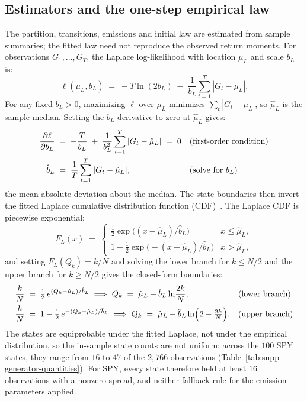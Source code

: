 \subsection{Estimators and the one-step empirical law}
\label{sec:supp-gen-estimators}

The partition, transitions, emissions and initial law are estimated from sample summaries; the fitted law need not reproduce the observed return moments. For observations $G_1, \dots, G_T$, the Laplace
log-likelihood with location $\mu_L$ and scale $b_L$ is:
\begin{equation}
  \ell(\mu_L, b_L) \;=\;
  -T \ln (2 b_L) \;-\; \frac{1}{b_L} \sum_{t=1}^{T} |G_t - \mu_L|.
  \label{eq:supp-laplace-ll}
\end{equation}
For any fixed $b_L > 0$, maximizing $\ell$ over $\mu_L$ minimizes
$\sum_t |G_t - \mu_L|$, so $\hat\mu_L$ is the sample median. Setting
the $b_L$ derivative to zero at $\hat\mu_L$ gives:
\begin{align}
  \frac{\partial \ell}{\partial b_L}
   &\;=\; -\frac{T}{b_L}
     \;+\; \frac{1}{b_L^2} \sum_{t=1}^{T} |G_t - \hat\mu_L|
     \;=\; 0
     && \text{(first-order condition)} \notag \\
  \hat b_L
   &\;=\; \frac{1}{T} \sum_{t=1}^{T} |G_t - \hat\mu_L|,
     && \text{(solve for $b_L$)}
  \label{eq:supp-laplace-mle}
\end{align}
the mean absolute deviation about the median. The state boundaries
then invert the fitted Laplace cumulative distribution function
(CDF)~\cite{kotzKozubowskiPodgorski2001}. The Laplace CDF is
piecewise exponential:
\begin{equation}
  F_L(x) \;=\;
  \begin{cases}
    \tfrac{1}{2} \exp\!\big((x - \hat\mu_L)/\hat b_L\big)
      & x \le \hat\mu_L,\\[4pt]
    1 - \tfrac{1}{2} \exp\!\big(-(x - \hat\mu_L)/\hat b_L\big)
      & x > \hat\mu_L,
  \end{cases}
  \label{eq:supp-laplace-cdf}
\end{equation}
and setting $F_L(Q_k) = k/N$ and solving the lower branch for
$k \le N/2$ and the upper branch for $k \ge N/2$ gives the closed-form
boundaries:
\begin{align}
  \frac{k}{N} &\;=\; \tfrac{1}{2}\,
    e^{(Q_k - \hat\mu_L)/\hat b_L}
  \;\Longrightarrow\;
  Q_k \;=\; \hat\mu_L + \hat b_L \ln\!\frac{2k}{N},
    && \text{(lower branch)} \notag \\
  \frac{k}{N} &\;=\; 1 - \tfrac{1}{2}\,
    e^{-(Q_k - \hat\mu_L)/\hat b_L}
  \;\Longrightarrow\;
  Q_k \;=\; \hat\mu_L - \hat b_L
    \ln\!\Big(2 - \tfrac{2k}{N}\Big).
    && \text{(upper branch)}
  \label{eq:supp-quantiles}
\end{align}
The states are equiprobable under the fitted Laplace, not under the
empirical distribution, so the in-sample state counts are not uniform:
across the $100$ SPY states, they range from $16$ to $47$ of the
$2{,}766$ observations (Table~\ref{tab:supp-generator-quantities}).
For SPY, every state therefore held at least $16$ observations with a
nonzero spread, and neither fallback rule for the emission parameters
applied.

